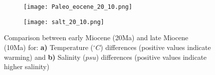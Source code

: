 \begin{figure}[H]
	\begin{subfigure}[b]{\linewidth}
		\caption{}
		\label{fig:2010cooling}
		\texttt{[image: Paleo\_eocene\_20\_10.png]}
	\end{subfigure}
	\begin{subfigure}[b]{\linewidth}
		\caption{}
		\label{fig:salt2010cooling}
		\texttt{[image: salt\_20\_10.png]}
	\end{subfigure}
	\caption{ Comparison between early Miocene (20Ma) and late Miocene (10Ma) for: \textbf{a)} Temperature ($^{\circ}C$) differences (positive values indicate warming) and  \textbf{b)} Salinity ($psu$) differences (positive values indicate higher salinity)}
\end{figure}

